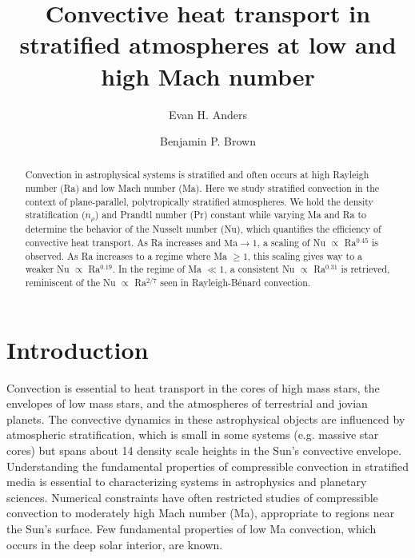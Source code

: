 \documentclass[aps, prl, twocolumn, nofootinbib, groupedaddress, amsfonts, amssymb, amsmath]{revtex4-1}
\newcommand{\RB}{Rayleigh-B\'{e}nard }
\newcommand{\nrho}{\ensuremath{n_{\rho}}}
\begin{document}
\author{Evan H. Anders}
\author{Benjamin P. Brown}
\title{Convective heat transport in stratified atmospheres at low and high Mach number}

\begin{abstract}
Convection in astrophysical systems is stratified and
often occurs at high Rayleigh number (Ra) and low
Mach number (Ma).
Here we study stratified convection in the context of 
plane-parallel, polytropically stratified atmospheres. 
We hold the density stratification (\nrho) and Prandtl 
number (Pr) constant while varying
Ma and Ra to determine 
the behavior of the Nusselt number (Nu), 
which quantifies the efficiency of convective heat transport.
As Ra increases and $\text{Ma} \rightarrow 1$, a scaling 
of Nu $\propto$ Ra$^{0.45}$ is observed.  
As Ra increases to a regime where Ma $\geq 1$,
this scaling gives way to a weaker Nu $\propto$ Ra$^{0.19}$. 
In the regime of Ma $\ll 1$, a consistent
Nu $\propto$ Ra$^{0.31}$ is retrieved,  reminiscent of the 
Nu $\propto$ Ra$^{2/7}$ seen in \RB convection.
\end{abstract}
\maketitle


\section{Introduction}
\label{sec:intro}
Convection is essential to heat transport in the cores of high mass stars,
the envelopes of low mass stars, and the atmospheres of terrestrial and 
jovian planets.  The convective dynamics in these astrophysical objects
are influenced by atmospheric 
stratification, which is small in some systems (e.g. massive star cores)
but spans about
14 density scale heights in the Sun's convective envelope.
Understanding the fundamental
properties of compressible convection in stratified media is essential
to characterizing systems in astrophysics and planetary sciences.  
Numerical constraints have often restricted studies of compressible
convection to moderately high Mach number (Ma), appropriate to regions near 
the Sun's surface.  Few fundamental properties of
low Ma convection, which occurs in the deep solar interior, are known.
\end{document}
